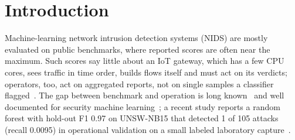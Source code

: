 \section{Introduction}\label{sec:intro}

Machine-learning network intrusion detection systems (NIDS) are mostly evaluated on public benchmarks, where reported scores are often near the maximum. Such scores say little about an IoT gateway, which has a few CPU cores, sees traffic in time order, builds flows itself and must act on its verdicts; operators, too, act on aggregated reports, not on single samples a classifier flagged~\cite{apruzzese2026reshaping}. The gap between benchmark and operation is long known~\cite{sommer2010outside} and well documented for security machine learning~\cite{arp2022dos,apruzzese2023sok}; a recent study reports a random forest with hold-out F1 0.97 on UNSW-NB15 that detected 1 of 105 attacks (recall 0.0095) in operational validation on a small labeled laboratory capture~\cite{tang2026hybrid}.

